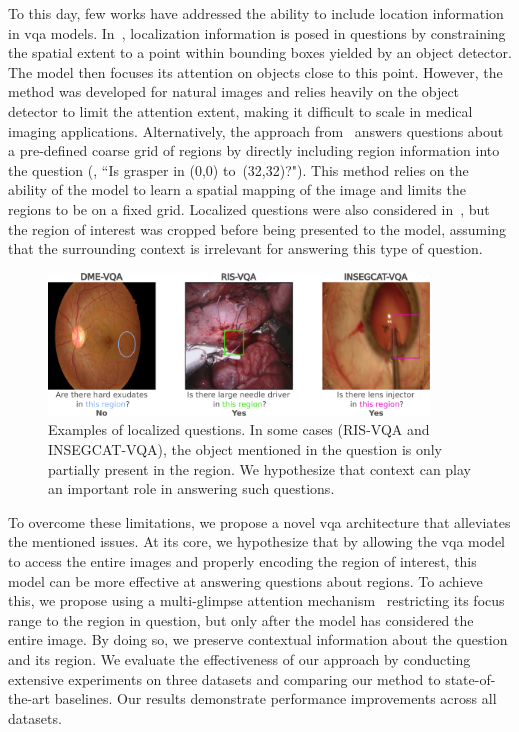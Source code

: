 To this day, few works have addressed the ability to include location information in \gls{vqa} models. In~\cite{mani2020point}, localization information is posed in questions by constraining the spatial extent to a point within bounding boxes yielded by an object detector. The model then focuses its attention on objects close to this point. However, the method was developed for natural images and relies heavily on the object detector to limit the attention extent, making it difficult to scale in medical imaging applications. Alternatively, the approach from~\cite{vu2020question} answers questions about a pre-defined coarse grid of regions by directly including region information into the question (\eg, ``Is grasper in (0,0) to~(32,32)?"). This method relies on the ability of the model to learn a spatial mapping of the image and limits the regions to be on a fixed grid. Localized questions were also considered in~\cite{tascon2022consistency}, but the region of interest was cropped before being presented to the model, assuming that the surrounding context is irrelevant for answering this type of question.
\begin{figure}[!t]
\begin{center}
\includegraphics[width=0.9\textwidth]{Figures/Part1_LocVQA/01_locatt/examples_data.pdf}
\caption{Examples of localized questions. In some cases (RIS-VQA and INSEGCAT-VQA), the object mentioned in the question is only partially present in the region. We hypothesize that context can play an important role in answering such questions.}
\label{fig:examples_data}
\end{center}
\end{figure}

To overcome these limitations, we propose a novel \gls{vqa} architecture that alleviates the mentioned issues. At its core, we hypothesize that by allowing the \gls{vqa} model to access the entire images and properly encoding the region of interest, this model can be more effective at answering questions about regions. To achieve this, we propose using a multi-glimpse attention mechanism~\cite{ben2017mutan,vu2020question,tascon2022consistency} restricting its focus range to the region in question, but only after the model has considered the entire image. By doing so, we preserve contextual information about the question and its region. We evaluate the effectiveness of our approach by conducting extensive experiments on three datasets and comparing our method to state-of-the-art baselines. Our results demonstrate performance improvements across all datasets. 